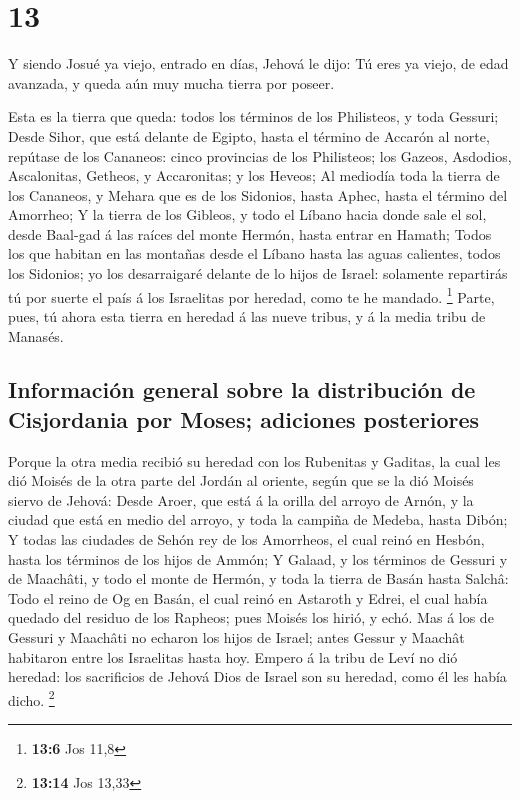 \hypertarget{section-12}{%
\section{13}\label{section-12}}

 Y siendo Josué ya viejo, entrado en días, Jehová le dijo:
Tú eres ya viejo, de edad avanzada, y queda aún muy mucha tierra por
poseer.

 Esta es la tierra que queda: todos los términos de los
Philisteos, y toda Gessuri;  Desde Sihor, que está delante
de Egipto, hasta el término de Accarón al norte, repútase de los
Cananeos: cinco provincias de los Philisteos; los Gazeos, Asdodios,
Ascalonitas, Getheos, y Accaronitas; y los Heveos;  Al
mediodía toda la tierra de los Cananeos, y Mehara que es de los
Sidonios, hasta Aphec, hasta el término del Amorrheo;  Y
la tierra de los Gibleos, y todo el Líbano hacia donde sale el sol,
desde Baal-gad á las raíces del monte Hermón, hasta entrar en Hamath;
 Todos los que habitan en las montañas desde el Líbano
hasta las aguas calientes, todos los Sidonios; yo los desarraigaré
delante de lo hijos de Israel: solamente repartirás tú por suerte el
país á los Israelitas por heredad, como te he mandado. \footnote{\textbf{13:6}
  Jos 11,8}  Parte, pues, tú ahora esta tierra en heredad
á las nueve tribus, y á la media tribu de Manasés.

\hypertarget{informaciuxf3n-general-sobre-la-distribuciuxf3n-de-cisjordania-por-moses-adiciones-posteriores}{%
\subsection{Información general sobre la distribución de Cisjordania por
Moses; adiciones
posteriores}\label{informaciuxf3n-general-sobre-la-distribuciuxf3n-de-cisjordania-por-moses-adiciones-posteriores}}

 Porque la otra media recibió su heredad con los Rubenitas
y Gaditas, la cual les dió Moisés de la otra parte del Jordán al
oriente, según que se la dió Moisés siervo de Jehová: 
Desde Aroer, que está á la orilla del arroyo de Arnón, y la ciudad que
está en medio del arroyo, y toda la campiña de Medeba, hasta Dibón;
 Y todas las ciudades de Sehón rey de los Amorrheos, el
cual reinó en Hesbón, hasta los términos de los hijos de Ammón;
 Y Galaad, y los términos de Gessuri y de Maachâti, y
todo el monte de Hermón, y toda la tierra de Basán hasta Salchâ:
 Todo el reino de Og en Basán, el cual reinó en Astaroth
y Edrei, el cual había quedado del residuo de los Rapheos; pues Moisés
los hirió, y echó.  Mas á los de Gessuri y Maachâti no
echaron los hijos de Israel; antes Gessur y Maachât habitaron entre los
Israelitas hasta hoy.  Empero á la tribu de Leví no dió
heredad: los sacrificios de Jehová Dios de Israel son su heredad, como
él les había dicho. \footnote{\textbf{13:14} Jos 13,33}


